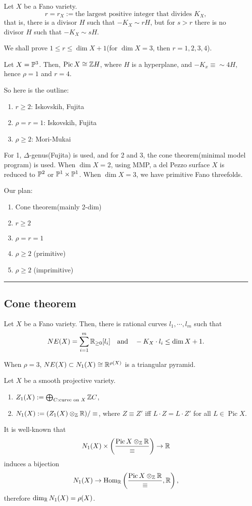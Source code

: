 \documentclass{../../small}
\DeclareMathOperator{\Pic}{Pic}
\begin{document}
\begin{defn}
Let $X$ be a Fano variety.
\[r=r_X:=\text{the largest positive integer that divides $K_X$},\]
that is, there is a divisor $H$ such that $-K_X\sim rH$, but for $s>r$ there is no divisor $H$ such that $-K_X\sim sH$.
\end{defn}

We shall prove $1\le r\le\dim X+1$(for $\dim X=3$, then $r=1,2,3,4$).
\begin{ex}
Let $X=\P^3$.
Then, $\Pic X\cong \Z H$, where $H$ is a hyperplane, and $-K_x\equiv\sim 4H$, hence $\rho=1$ and $r=4$.
\end{ex}

So here is the outline:
\begin{enumerate}
\item $r\ge2$: Iskovskih, Fujita
\item $\rho=r=1$: Iskovskih, Fujita
\item $\rho\ge2$: Mori-Mukai
\end{enumerate}
For 1, $\Delta$-genus(Fujita) is used, and for 2 and 3, the cone theorem(minimal model program) is used.
When $\dim X=2$, using MMP, a del Pezzo surface $X$ is reduced to $\P^2$ or $\P^1\times\P^1$.
When $\dim X=3$, we have primitive Fano threefolds.

Our plan:
\begin{enumerate}
\item Cone theorem(mainly 2-dim)
\item $r\ge2$
\item $\rho=r=1$
\item $\rho\ge2$ (primitive)
\item $\rho\ge2$ (imprimitive)
\end{enumerate}
\smallskip\hrule

\subsection*{Cone theorem}
\begin{thm}
Let $X$ be a Fano variety.
Then, there is rational curves $l_1,\cdots,l_m$ such that
\[NE(X)=\sum_{i=1}^m\R_{\ge0}[l_i]\quad\text{and}\quad-K_X\cdot l_i\le\dim X+1.\]
\end{thm}
When $\rho=3$, $NE(X)\subset N_1(X)\cong\R^{\rho(X)}$ is a triangular pyramid.

\begin{defn}
Let $X$ be a smooth projective variety.
\begin{enumerate}
\item $Z_1(X):=\bigoplus_{C:\text{curve on }X}\Z C$,
\item $N_1(X):=(Z_1(X)\otimes_\Z\R)/\equiv$, where $Z\equiv Z'$ iff $L\cdot Z=L\cdot Z'$ for all $L\in\Pic X$.
\end{enumerate}
\end{defn}
It is well-known that
\[N_1(X)\times\left(\frac{\Pic X\otimes_\Z\R}{\equiv}\right)\to\R\]
induces a bijection
\[N_1(X)\to\Hom_\R\left(\frac{\Pic X\otimes_\Z\R}{\equiv},\R\right),\]
therefore $\dim_\R N_1(X)=\rho(X)$.
\end{document}
